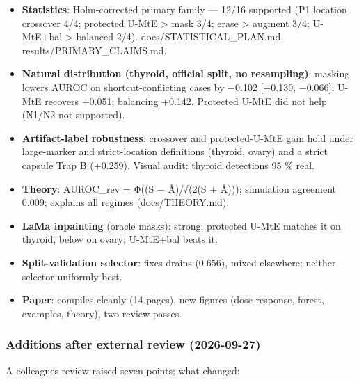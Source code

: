 {\begin{itemize}
\item
  \textbf{Statistics}: Holm-corrected primary family --- 12/16 supported (P1 location crossover 4/4; protected U-MtE \textgreater{}
  mask 3/4; erase \textgreater{} augment 3/4; U-MtE+bal \textgreater{} balanced 2/4). docs/STATISTICAL\_PLAN.md, results/PRIMARY\_CLAIMS.md.
\item
  \textbf{Natural distribution (thyroid, official split, no resampling)}: masking lowers AUROC on shortcut-conflicting
  cases by −0.102 {[}−0.139, −0.066{]}; U-MtE recovers +0.051; balancing +0.142. Protected U-MtE did not help (N1/N2 not
  supported).
\item
  \textbf{Artifact-label robustness}: crossover and protected-U-MtE gain hold under large-marker and strict-location
  definitions (thyroid, ovary) and a strict capsule Trap B (+0.259). Visual audit: thyroid detections 95 \% real.
\item
  \textbf{Theory}: AUROC\_rev = Φ((S − Ã)/√(2(S + Ã))); simulation agreement 0.009; explains all regimes (docs/THEORY.md).
\item
  \textbf{LaMa inpainting} (oracle masks): strong; protected U-MtE matches it on thyroid, below on ovary; U-MtE+bal beats it.
\item
  \textbf{Split-validation selector}: fixes drains (0.656), mixed elsewhere; neither selector uniformly best.
\item
  \textbf{Paper}: compiles cleanly (14 pages), new figures (dose-response, forest, examples, theory), two review passes.
\end{itemize}

\subsubsection{Additions after external review (2026-09-27)}\label{additions-after-external-review-2026-09-27}

A colleague\textquotesingle s review raised seven points; what changed:

\begin{itemize}


\end{itemize}}
